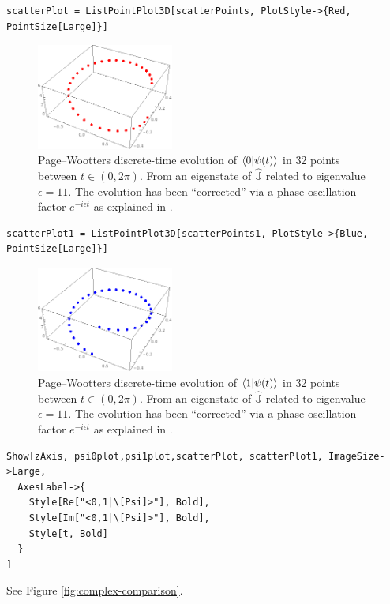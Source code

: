 \begin{Verbatim}
scatterPlot = ListPointPlot3D[scatterPoints, PlotStyle->{Red, PointSize[Large]}]
\end{Verbatim}
\begin{figure}[!h]
  \centering
  \includegraphics[width=0.4\textwidth]{img/scatterplot0.png}
  \caption[(from notebook)]{
    Page--Wootters discrete-time evolution of
    $\braket{0}{\psi(t)}$ in 32 points between
    $t \in (0, 2\pi) $. From an eigenstate of
    $\hat{\mathbb{J}}$ related to eigenvalue $\epsilon = 11$.
    The evolution has been ``corrected'' via a phase oscillation
    factor $e^{-i \epsilon t}$
    as explained in \cite[``The Zero-eigenvalue'']{Lloyd:Time}.
  }
\end{figure}

\begin{Verbatim}
scatterPlot1 = ListPointPlot3D[scatterPoints1, PlotStyle->{Blue, PointSize[Large]}]
\end{Verbatim}
\begin{figure}[!h]
  \centering
  \includegraphics[width=0.4\textwidth]{img/scatterplot1.png}
  \caption[(from notebook)]{
    Page--Wootters discrete-time evolution of
    $\braket{1}{\psi(t)}$ in 32 points between
    $t \in (0, 2\pi) $. From an eigenstate of
    $\hat{\mathbb{J}}$ related to eigenvalue $\epsilon = 11$.
    The evolution has been ``corrected'' via a phase oscillation
    factor $e^{-i \epsilon t}$
    as explained in \cite[``The Zero-eigenvalue'']{Lloyd:Time}.
  }
\end{figure}

\begin{Verbatim}
Show[zAxis, psi0plot,psi1plot,scatterPlot, scatterPlot1, ImageSize->Large,
  AxesLabel->{
    Style[Re["<0,1|\[Psi]>"], Bold],
    Style[Im["<0,1|\[Psi]>"], Bold],
    Style[t, Bold]
  }
]
\end{Verbatim}
See Figure \ref{fig:complex-comparison}.